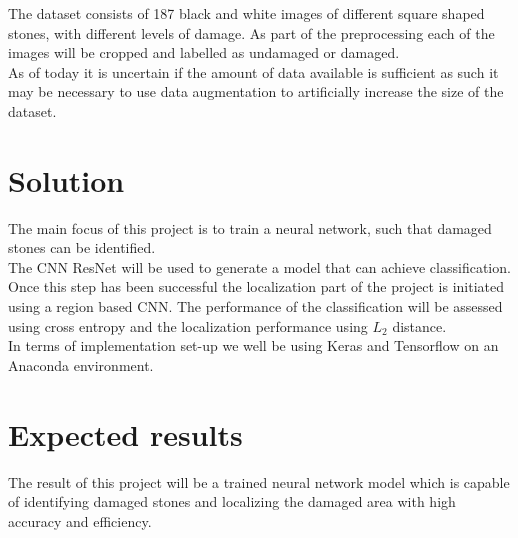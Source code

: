\documentclass[
a4paper, 
10pt         %
]{article}  %
\begin{document}
The dataset consists of 187 black and white images of different square shaped stones, with different levels of damage. As part of the preprocessing each of the images will be cropped and labelled as undamaged or damaged.\\
As of today it is uncertain if the amount of data available is sufficient as such it may be necessary to use data augmentation to artificially increase the size of the dataset.

\section{Solution}
The main focus of this project is to train a neural network, such that damaged stones can be identified. \\

The CNN ResNet will be used to generate a model that can achieve classification. Once this step has been successful the localization part of the project is initiated using a region based CNN. The performance of the classification will be assessed using cross entropy and the localization performance using $L_{2}$ distance.\\

In terms of implementation set-up we well be using Keras and Tensorflow on an Anaconda environment. 


\section{Expected results}
The result of this project will be a trained neural network model which is capable of identifying damaged stones and localizing the damaged area with high accuracy and efficiency.  
\end{document}
